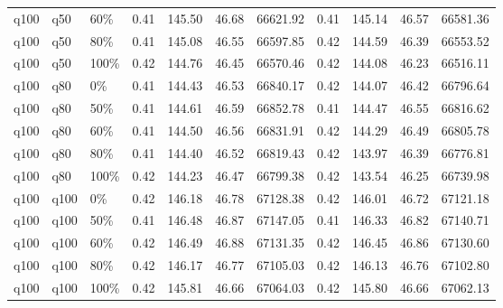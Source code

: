 \begin{longtable}{lllrrrrrrrr}
  q100 & q50 & 60\% & 0.41 & 145.50 & 46.68 & 66621.92 & 0.41 & 145.14 & 46.57 & 66581.36 \\ 
  q100 & q50 & 80\% & 0.41 & 145.08 & 46.55 & 66597.85 & 0.42 & 144.59 & 46.39 & 66553.52 \\ 
  q100 & q50 & 100\% & 0.42 & 144.76 & 46.45 & 66570.46 & 0.42 & 144.08 & 46.23 & 66516.11 \\ 
  q100 & q80 & 0\% & 0.41 & 144.43 & 46.53 & 66840.17 & 0.42 & 144.07 & 46.42 & 66796.64 \\ 
  q100 & q80 & 50\% & 0.41 & 144.61 & 46.59 & 66852.78 & 0.41 & 144.47 & 46.55 & 66816.62 \\ 
  q100 & q80 & 60\% & 0.41 & 144.50 & 46.56 & 66831.91 & 0.42 & 144.29 & 46.49 & 66805.78 \\ 
  q100 & q80 & 80\% & 0.41 & 144.40 & 46.52 & 66819.43 & 0.42 & 143.97 & 46.39 & 66776.81 \\ 
  q100 & q80 & 100\% & 0.42 & 144.23 & 46.47 & 66799.38 & 0.42 & 143.54 & 46.25 & 66739.98 \\ 
  q100 & q100 & 0\% & 0.42 & 146.18 & 46.78 & 67128.38 & 0.42 & 146.01 & 46.72 & 67121.18 \\ 
  q100 & q100 & 50\% & 0.41 & 146.48 & 46.87 & 67147.05 & 0.41 & 146.33 & 46.82 & 67140.71 \\ 
  q100 & q100 & 60\% & 0.42 & 146.49 & 46.88 & 67131.35 & 0.42 & 146.45 & 46.86 & 67130.60 \\ 
  q100 & q100 & 80\% & 0.42 & 146.17 & 46.77 & 67105.03 & 0.42 & 146.13 & 46.76 & 67102.80 \\ 
  q100 & q100 & 100\% & 0.42 & 145.81 & 46.66 & 67064.03 & 0.42 & 145.80 & 46.66 & 67062.13 \\ 
  \hline
\end{longtable}
\endgroup